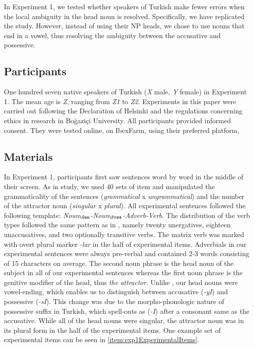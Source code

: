 \documentclass[doc,a4paper,man,natbib,floatsintext,noextraspace]{apa6}\usepackage[]{graphicx}\usepackage[]{color}
\begin{document}
In Experiment 1, we tested whether speakers of Turkish make fewer errors when the local ambiguity in the head noun is resolved. Specifically, we have replicated the \citet{LagoEtAl:2018} study. However, instead of using their NP heads, we chose to use nouns that end in a vowel, thus resolving the ambiguity between the accusative and possessive. 

\subsection{Participants} \label{sec:exp1:participants}

One hundred seven native speakers of Turkish (\textit{X} male, \textit{Y} female) in Experiment 1. The mean age is \textit{Z}, ranging from \textit{Z1} to \textit{Z2}. Experiments in this paper were carried out following the Declaration of Helsinki and the regulations concerning ethics in research in Bo\u{g}azi\c{c}i University. All participants provided informed consent. They were tested online, on IbexFarm, using their preferred platform, 

\subsection{Materials} \label{sec:exp1:materials}

In Experiment 1, participants first saw sentences word by word in the middle of their screen. As in \citet{LagoEtAl:2018} study, we used 40 sets of item and manipulated the grammaticality of the sentences (\textit{grammatical} x \textit{ungrammatical}) and the number of the attractor noun (\textit{singular} x \textit{plural}). All experimental sentences followed the following template: \textit{Noun$_{\Gen}$-Noun$_{\Poss}$-Adverb-Verb}. The distribution of the verb types followed the same pattern as in \citet{LagoEtAl:2018}, namely twenty unergatives, eighteen unaccusatives, and two optionally transitive verbs. The matrix verb was marked with overt plural marker \textit{-lar} in the half of experimental items. Adverbials in our experimental sentences were always pre-verbal and contained 2-3 words consisting of 15 characters on average. The second noun phrase is the head noun of the subject in all of our experimental sentences whereas the first noun phrase is the genitive modifier of the head, thus \textit{the attractor}. Unlike \citet{LagoEtAl:2018}, our head nouns were vowel-ending, which enables us to distinguish between accusative (\textit{-yI}) and possessive (\textit{-sI}). This change was due to the morpho-phonologic nature of possessive suffix in Turkish, which spell-outs as (\textit{-I}) after a consonant same as the accusative. While all of the head nouns were singular, the attractor noun was in its plural form in the half of the experimental items. One example set of experimental items can be seen in \ref{item:exp1ExperimentalItems}.
\end{document}
